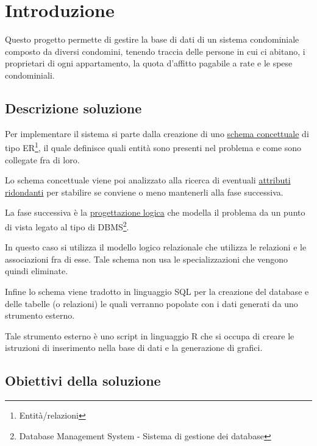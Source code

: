 \section{Introduzione}

Questo progetto permette di gestire la base di dati di
un sistema condominiale composto da diversi condomini,
tenendo traccia delle persone in cui ci abitano, i
proprietari di ogni appartamento, la quota d'affitto
pagabile a rate e le spese condominiali.

\subsection{Descrizione soluzione}

Per implementare il sistema si parte dalla creazione di uno
\hyperref[schemaER]{schema concettuale}
di tipo ER\footnote{Entità/relazioni},
il quale definisce quali entità sono presenti nel problema
e come sono collegate fra di loro.

Lo schema concettuale viene poi analizzato alla ricerca di
eventuali
\hyperref[ridondanze]{attributi ridondanti}
per stabilire se conviene o meno mantenerli alla fase successiva.

La fase successiva è la
\hyperref[logico]{progettazione logica}
che modella il problema da un punto di vista legato al tipo di
DBMS\footnote{Database Management System - Sistema di gestione dei database}.

In questo caso si utilizza il modello logico relazionale che
utilizza le relazioni e le associazioni fra di esse. Tale schema
non usa le specializzazioni che vengono quindi eliminate.


Infine lo schema viene tradotto in linguaggio SQL per la
creazione del database e delle tabelle (o relazioni) le quali
verranno popolate con i dati generati da uno strumento esterno.

Tale strumento esterno è uno script in linguaggio R che si
occupa di creare le istruzioni di inserimento nella base di dati
e la generazione di grafici.

\subsection{Obiettivi della soluzione}


